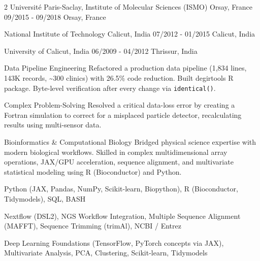 \documentclass{thejus_cv}
\begin{document}
\begin{paracol}{2}
             {Universit\'e Paris-Saclay, Institute of Molecular Sciences (ISMO) Orsay, France}
             {09/2015 - 09/2018}
             {Orsay, France}
             {}

             {National Institute of Technology Calicut, India}
             {07/2012 - 01/2015}
             {Calicut, India}
             {}

             {University of Calicut, India}
             {06/2009 - 04/2012}
             {Thrissur, India}
             {}



\switchcolumn



\cvstrength{\faStar}
           {Data Pipeline Engineering}
           {Refactored a production data pipeline (1,834 lines, 143K records, \textasciitilde300 clinics) with 26.5\% code reduction. Built degirtools R package. Byte-level verification after every change via \texttt{identical()}.}

\cvstrength{\faLightbulb}
           {Complex Problem-Solving}
           {Resolved a critical data-loss error by creating a Fortran simulation to correct for a misplaced particle detector, recalculating results using multi-sensor data.}

\cvstrength{\faAward}
           {Bioinformatics \& Computational Biology}
           {Bridged physical science expertise with modern biological workflows. Skilled in complex multidimensional array operations, JAX/GPU acceleration, sequence alignment, and multivariate statistical modeling using R (Bioconductor) and Python.}


         {Python (JAX, Pandas, NumPy, Scikit-learn, Biopython), R (Bioconductor, Tidymodels), SQL, BASH}

         {Nextflow (DSL2), NGS Workflow Integration, Multiple Sequence Alignment (MAFFT), Sequence Trimming (trimAl), NCBI / Entrez}

         {Deep Learning Foundations (TensorFlow, PyTorch concepts via JAX), Multivariate Analysis, PCA, Clustering, Scikit-learn, Tidymodels}


\end{paracol}
\end{document}
